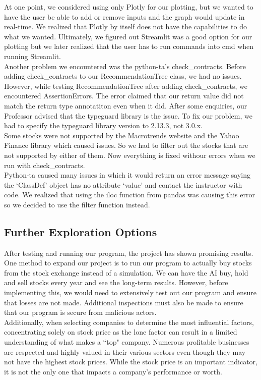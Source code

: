 \documentclass[fontsize=11pt]{article}
\begin{document}
At one point, we considered using only Plotly for our plotting, but we wanted to have the user be able to add or remove inputs and the graph would update in real-time. We realized that Plotly by itself does not have the capabilities to do what we wanted. Ultimately, we figured out Streamlit was a good option for our plotting but we later realized that the user has to run commands into cmd when running Streamlit. 
\\

Another problem we encountered was the python-ta's check\_contracts. Before adding check\_contracts to our RecommendationTree class, we had no issues. However, while testing RecommendationTree after adding check\_contracts, we encountered AssertionErrors. The error claimed that our return value did not match the return type annotatiton even when it did. After some enquiries, our Professor advised that the typeguard library is the issue. To fix our problem, we had to specify the typeguard library version to 2.13.3, not 3.0.x.
\\
Some stocks were not supported by the Macrotrends website and the Yahoo Finance library which caused issues. So we had to filter out the stocks that are not supported by either of them. Now everything is fixed withour errors when we run with check\_contracts.
\\

Python-ta caused many issues in which it would return an error message saying the `ClassDef' object has no attribute `value' and contact the instructor with code. We realized that using the iloc function from pandas was causing this error so we decided to use the filter function instead.

\subsection{Further Exploration Options}
After testing and running our program, the project has shown promising results. One method to expand our project is to run our program to actually buy stocks from the stock exchange instead of a simulation. We can have the AI buy, hold and sell stocks every year and see the long-term results. However, before implementing this, we would need to extensively test out our program and ensure that losses are not made. Additional inspections must also be made to ensure that our program is secure from malicious actors.\\

Additionally, when selecting companies to determine the most influential factors, concentrating solely on stock price as the lone factor can result in a limited understanding of what makes a ``top" company. Numerous profitable businesses are respected and highly valued in their various sectors even though they may not have the highest stock prices. While the stock price is an important indicator, it is not the only one that impacts a company's performance or worth.\\
\end{document}
